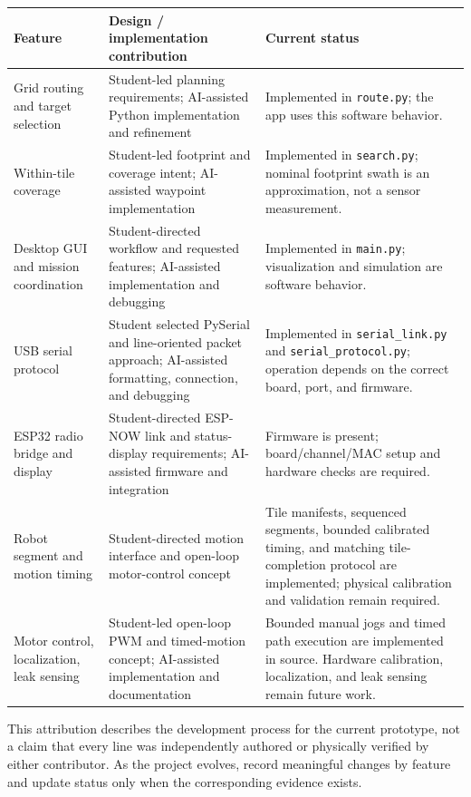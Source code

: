 \documentclass{article}
\begin{document}
\begin{center}
\begin{tabular}{>{\raggedright\arraybackslash}p{} >{\raggedright\arraybackslash}p{} >{\raggedright\arraybackslash}p{}}
\toprule
\textbf{Feature} & \textbf{Design / implementation contribution} & \textbf{Current status}\\
\midrule
Grid routing and target selection & Student-led planning requirements; AI-assisted Python implementation and refinement & Implemented in \texttt{route.py}; the app uses this software behavior.\\
Within-tile coverage & Student-led footprint and coverage intent; AI-assisted waypoint implementation & Implemented in \texttt{search.py}; nominal footprint swath is an approximation, not a sensor measurement.\\
Desktop GUI and mission coordination & Student-directed workflow and requested features; AI-assisted implementation and debugging & Implemented in \texttt{main.py}; visualization and simulation are software behavior.\\
USB serial protocol & Student selected PySerial and line-oriented packet approach; AI-assisted formatting, connection, and debugging & Implemented in \texttt{serial\_link.py} and \texttt{serial\_protocol.py}; operation depends on the correct board, port, and firmware.\\
ESP32 radio bridge and display & Student-directed ESP-NOW link and status-display requirements; AI-assisted firmware and integration & Firmware is present; board/channel/MAC setup and hardware checks are required.\\
Robot segment and motion timing & Student-directed motion interface and open-loop motor-control concept & Tile manifests, sequenced segments, bounded calibrated timing, and matching tile-completion protocol are implemented; physical calibration and validation remain required.\\
Motor control, localization, leak sensing & Student-led open-loop PWM and timed-motion concept; AI-assisted implementation and documentation & Bounded manual jogs and timed path execution are implemented in source. Hardware calibration, localization, and leak sensing remain future work.\\
\bottomrule
\end{tabular}
\end{center}

This attribution describes the development process for the current prototype, not a claim that every line was independently authored or physically verified by either contributor. As the project evolves, record meaningful changes by feature and update status only when the corresponding evidence exists.
\end{document}
